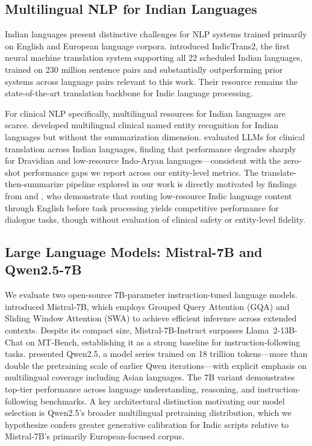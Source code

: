 \documentclass[10pt,twocolumn]{article}
\begin{document}
\subsection{Multilingual NLP for Indian Languages}

Indian languages present distinctive challenges for NLP
systems trained primarily on English and European language
corpora.
\citet{gala2023indictrans} introduced IndicTrans2, the first
neural machine translation system supporting all 22 scheduled
Indian languages, trained on 230 million sentence pairs and
substantially outperforming prior systems across language pairs
relevant to this work.
Their resource remains the state-of-the-art translation
backbone for Indic language processing.

For clinical NLP specifically, multilingual resources for
Indian languages are scarce.
\citet{bhatt2022multilingual} developed multilingual clinical
named entity recognition for Indian languages but without
the summarization dimension.
\citet{indihealthbench2025} evaluated LLMs for clinical
translation across Indian languages, finding that
performance degrades sharply for Dravidian and low-resource
Indo-Aryan languages---consistent with the zero-shot
performance gaps we report across our entity-level metrics.
The translate-then-summarize pipeline explored in our work
is directly motivated by findings from
\citet{kl33n3x2025} and \citet{clinsimp2025}, who demonstrate
that routing low-resource Indic language content through
English before task processing yields competitive performance
for dialogue tasks, though without evaluation of clinical
safety or entity-level fidelity.

\subsection{Large Language Models: Mistral-7B and Qwen2.5-7B}

We evaluate two open-source 7B-parameter instruction-tuned
language models.
\citet{jiang2023mistral} introduced Mistral-7B, which employs
Grouped Query Attention (GQA) and Sliding Window Attention (SWA)
to achieve efficient inference across extended contexts.
Despite its compact size, Mistral-7B-Instruct surpasses
Llama~2-13B-Chat on MT-Bench, establishing it as a strong
baseline for instruction-following tasks.
\citet{qwen25} presented Qwen2.5, a model series trained on
18 trillion tokens---more than double the pretraining scale
of earlier Qwen iterations---with explicit emphasis on
multilingual coverage including Asian languages.
The 7B variant demonstrates top-tier performance across
language understanding, reasoning, and instruction-following
benchmarks.
A key architectural distinction motivating our model
selection is Qwen2.5's broader multilingual pretraining
distribution, which we hypothesize confers greater
generative calibration for Indic scripts relative to
Mistral-7B's primarily European-focused corpus.
\end{document}

